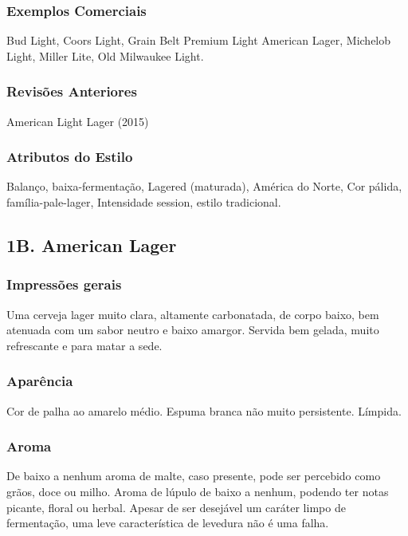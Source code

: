 \begin{multicols}{2}
\subsubsection*{Exemplos Comerciais}

Bud Light, Coors Light, Grain Belt Premium Light American Lager, Michelob Light, Miller Lite, Old Milwaukee Light.

\subsubsection*{Revisões Anteriores}

American Light Lager (2015)

\subsubsection*{Atributos do Estilo}

Balanço, baixa-fermentação, Lagered (maturada), América do Norte, Cor pálida, família-pale-lager, Intensidade session, estilo tradicional.

\vspace{5mm}

\subsection*{1B. American Lager}

\subsubsection*{Impressões gerais}

Uma cerveja lager muito clara, altamente carbonatada, de corpo baixo, bem atenuada com um sabor neutro e baixo amargor. Servida bem gelada, muito refrescante e para matar a sede.

\subsubsection*{Aparência}

Cor de palha ao amarelo médio. Espuma branca não muito persistente. Límpida.

\subsubsection*{Aroma}

De baixo a nenhum aroma de malte, caso presente, pode ser percebido como grãos, doce ou milho. Aroma de lúpulo de baixo a nenhum, podendo ter notas picante, floral ou herbal. Apesar de ser desejável um caráter limpo de fermentação, uma leve característica de levedura não é uma falha.


\end{multicols}
